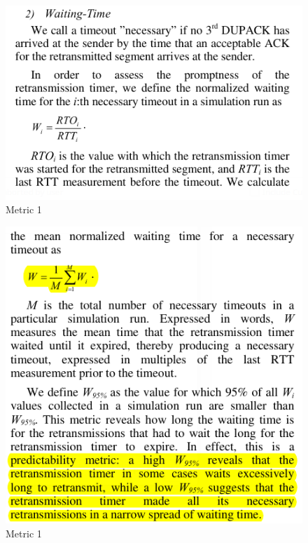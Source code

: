 \documentclass{article}[12pt]
\begin{document}
\begin{figure}[!h]
	\centering
	\includegraphics[width=.9\textwidth]{Pictures/algo/algo2.png}
	\caption{Metric 1}
\end{figure}

\begin{figure}[t!]
	\centering
	\includegraphics[width=.9\textwidth]{Pictures/algo/algo3.png}
	\caption{Metric 1}
\end{figure}
\end{document}
